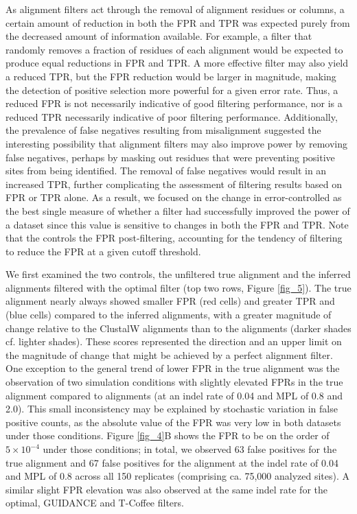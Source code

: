 \documentclass{article}
\begin{document}
As alignment filters act through the removal of alignment residues or
columns, a certain amount of reduction in both the FPR and TPR was expected
purely from the decreased amount of information available. For
example, a filter that randomly removes a fraction of residues of each
alignment would be expected to produce equal reductions in FPR and
TPR. A more effective filter may also yield a reduced TPR, but the FPR
reduction would be larger in magnitude, making the detection of
positive selection more powerful for a given error rate. Thus, a
reduced FPR is not necessarily indicative of good filtering
performance, nor is a reduced TPR necessarily indicative of poor
filtering performance. Additionally, the prevalence of false negatives
resulting from misalignment suggested the interesting possibility that alignment filters may also
improve power by removing false negatives, perhaps by masking out
residues that were preventing positive sites from being
identified. The removal of false negatives would result in an
increased TPR, further complicating the assessment of filtering
results based on FPR or TPR alone. As a result, we focused on the
change in error-controlled \tpr{} as the best single measure of
whether a filter had successfully improved the \sw power of a dataset
since this value is sensitive to changes in both the FPR and TPR. Note
that the \tpr controls the FPR post-filtering, accounting for the
tendency of filtering to reduce the FPR at a given cutoff threshold.

We first examined the two controls, the unfiltered true alignment and
the inferred alignments filtered with the optimal filter (top two
rows, Figure \ref{fig_5}). The true alignment nearly always showed
smaller FPR (red cells) and greater TPR and \tpr (blue cells) compared
to the inferred alignments, with a greater magnitude of change
relative to the ClustalW alignments than to the \prankc alignments
(darker shades cf. lighter shades). These scores represented the
direction and an upper limit on the magnitude of change that might be
achieved by a perfect alignment filter. One exception to the general
trend of lower FPR in the true alignment was the observation of two
simulation conditions with slightly elevated FPRs in the true
alignment compared to \prankc alignments (at an indel rate of 0.04 and
MPL of 0.8 and 2.0). This small inconsistency may be explained by
stochastic variation in false positive counts, as the absolute value
of the FPR was very low in both datasets under those
conditions. Figure \ref{fig_4}B shows the FPR to be on the order of
$5\times10^{-4}$ under those conditions; in total, we observed 63
false positives for the true alignment and 67 false positives for the
\prankc alignment at the indel rate of 0.04 and MPL of 0.8 across all
150 replicates (comprising ca. 75,000 analyzed sites). A similar
slight FPR elevation was also observed at the same indel rate for the
optimal, GUIDANCE and T-Coffee filters.
\end{document}
